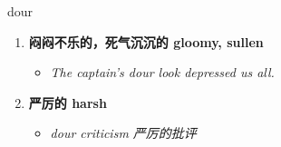 
\begin{frame}
{\huge dour}
\begin{center}
\begin{enumerate}\Large
  \item \textbf{闷闷不乐的，死气沉沉的 gloomy, sullen}
  \begin{itemize}
    \item \em{\Large{The captain's dour look depressed us all.}}
  \end{itemize}
  \item \textbf{严厉的 harsh}
  \begin{itemize}
    \item \em{\Large{dour criticism 严厉的批评}}
  \end{itemize}
\end{enumerate}
\end{center}
\end{frame}
